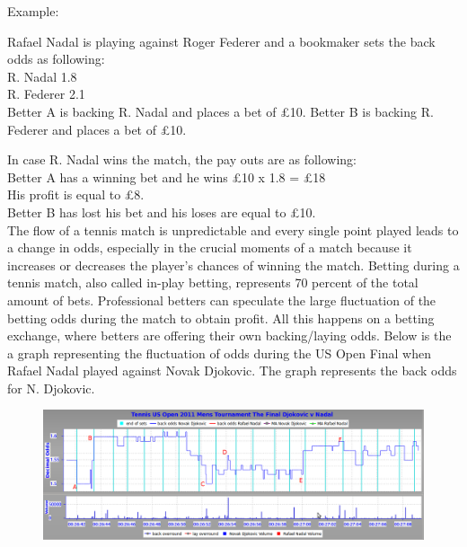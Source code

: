 \documentclass[10pt]{report}
\begin{document}
Example: 

Rafael Nadal is playing against Roger Federer and a bookmaker sets the back odds as following:\\
R. Nadal               1.8\\
R. Federer             2.1\\

Better A is backing R. Nadal and places a bet of \pounds10. 
Better B is backing R. Federer and places a bet of \pounds 10.

In case R. Nadal wins the match, the pay outs are as following:\\
Better A has a winning bet and he wins \pounds10 x 1.8 = \pounds18\\
His profit is equal to \pounds8.\\
Better B has lost his bet and his loses are equal to \pounds10. \\

The flow of a tennis match is unpredictable and every single point played leads to a change in odds, 
especially in the crucial moments of a match because it increases or decreases the player's chances of winning the match. 
Betting during a tennis match, also called in-play betting, represents 70 percent of the total amount of bets. Professional betters can 
speculate the large fluctuation of the betting odds during the match to obtain profit. All this happens on a betting exchange, where 
betters are offering their own backing/laying odds. 
Below is the a graph representing the fluctuation of odds during the US Open Final when Rafael Nadal played against Novak Djokovic. 
The graph represents the back odds for N. Djokovic. 

\begin{figure}[ht]
\centering
\includegraphics[scale=0.4]{tenistrading.png}
\caption{}
\end{figure}
\end{document}
